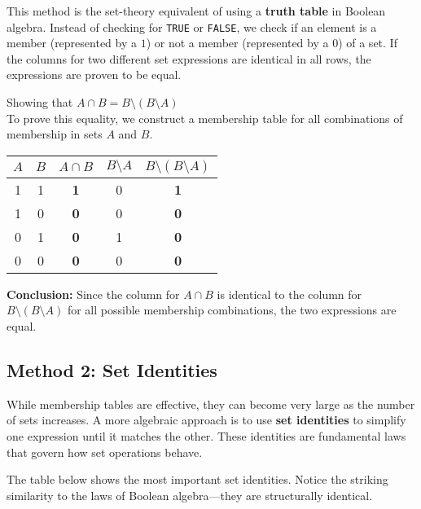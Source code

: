 This method is the set-theory equivalent of using a \textbf{truth table} in Boolean algebra. Instead of checking for \texttt{TRUE} or \texttt{FALSE}, we check if an element is a member (represented by a $1$) or not a member (represented by a $0$) of a set. If the columns for two different set expressions are identical in all rows, the expressions are proven to be equal.

\begin{example}{Showing that $A \cap B = B \setminus (B \setminus A)$}\\
    To prove this equality, we construct a membership table for all combinations of membership in sets $A$ and $B$.
    
    \begin{center}
    \renewcommand{\arraystretch}{1.5}
    \begin{tabular}{|c|c||c|c|c|}
        \hline
        $A$ & $B$ & $A \cap B$ & $B \setminus A$ & $B \setminus (B \setminus A)$ \\
        \hline
        1 & 1 & \textbf{1} & 0 & \textbf{1} \\
        1 & 0 & \textbf{0} & 0 & \textbf{0} \\
        0 & 1 & \textbf{0} & 1 & \textbf{0} \\
        0 & 0 & \textbf{0} & 0 & \textbf{0} \\
        \hline
    \end{tabular}
    \end{center}
    
    \textbf{Conclusion:} Since the column for $A \cap B$ is identical to the column for $B \setminus (B \setminus A)$ for all possible membership combinations, the two expressions are equal.
\end{example}

\subsection*{Method 2: Set Identities}
While membership tables are effective, they can become very large as the number of sets increases. A more algebraic approach is to use \textbf{set identities} to simplify one expression until it matches the other. These identities are fundamental laws that govern how set operations behave.

The table below shows the most important set identities. Notice the striking similarity to the laws of Boolean algebra—they are structurally identical.

